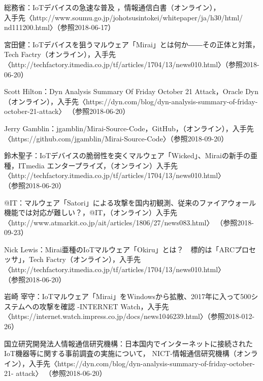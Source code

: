 
\begin{thebibliography}{30}
		総務省：IoTデバイスの急速な普及 ，情報通信白書（オンライン），\\入手先〈http://www.soumu.go.jp/johotsusintokei/whitepaper/ja/h30/html/ \\nd111200.html〉（参照2018-06-17）
    
        宮田健：IoTデバイスを狙うマルウェア「Mirai」とは何か――その正体と対策，Tech Factry（オンライン），入手先〈http:\slash\slash{}techfactory.itmedia.co.jp\slash{}tf\slash{}articles\slash{}1704\slash{}13\slash{}news010.html〉（参照2018-06-20）

       Scott Hilton：Dyn Analysis Summary Of Friday October 21 Attack，Oracle Dyn（オンライン），入手先〈https:\slash\slash{}dyn.com\slash{}blog\slash{}dyn-analysis-summary-of-friday-october-21-attack〉 （参照2018-06-20）
       
       Jerry Gamblin：jgamblin/Mirai-Source-Code，GitHub，（オンライン），入手先〈https://github.com/jgamblin/Mirai-Source-Code〉（参照2018-09-20）
    
       鈴木聖子：IoTデバイスの脆弱性を突くマルウェア「Wicked」、Miraiの新手の亜種，ITmedia エンタープライズ，（オンライン）入手先〈http:\slash\slash{}techfactory.itmedia.co.jp\slash{}tf\slash{}articles\slash{}1704\slash{}13\slash{}news010.html〉\\（参照2018-06-20）
   
       @IT：マルウェア「Satori」による攻撃を国内初観測、従来のファイアウォール機能では対応が難しい？，@IT，（オンライン）入手先〈http:\slash\slash{}www.atmarkit.co.jp\slash{}ait\slash{}articles\slash{}1806\slash{}27\slash{}news083.html〉 （参照2018-09-23）

       Nick Lewis：Mirai亜種のIoTマルウェア「Okiru」とは？　標的は「ARCプロセッサ」，Tech Factry（オンライン），入手先〈http:\slash\slash{}techfactory.itmedia.co.jp\slash{}tf\slash{}articles\slash{}1704\slash{}13\slash{}news010.html〉\\（参照2018-06-20）

       岩崎 宰守：IoTマルウェア「Mirai」をWindowsから拡散、2017年に入って500システムへの攻撃を確認 -INTERNET Watch，入手先〈https:\slash\slash{}internet.watch.impress.co.jp\slash{}docs\slash{}news1046239.html〉（参照2018-012-26）
    
        国立研究開発法人情報通信研究機構：日本国内でインターネットに接続されたIoT機器等に関する事前調査の実施について， NICT-情報通信研究機構（オンライン），入手先〈https:\slash\slash{}dyn.com\slash{}blog\slash{}dyn-analysis-summary-of-friday-october-21-
        attack〉 （参照2018-06-20）
        

\end{thebibliography}
